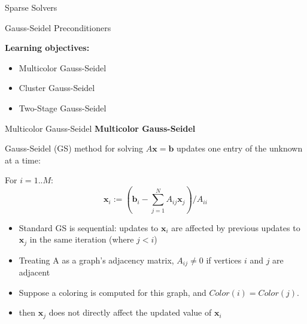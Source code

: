 \begin{frame}[fragile]

  {\Huge Sparse Solvers}

  \vspace{10pt}

  {\large Gauss-Seidel Preconditioners}

  \vspace{20pt}

  \textbf{Learning objectives:}
  \begin{itemize}
    \item {Multicolor Gauss-Seidel}
    \item {Cluster Gauss-Seidel}
    \item {Two-Stage Gauss-Seidel}
  \end{itemize}

  \vspace{-20pt}

\end{frame}


\begin{frame}[fragile]{Multicolor Gauss-Seidel}
\textbf{Multicolor Gauss-Seidel}

Gauss-Seidel (GS) method for solving $A\mathbf{x} = \mathbf{b}$ updates one entry of the unknown at a time:

For $i = 1..M$:
\[ \mathbf{x}_i := (\mathbf{b}_i - \sum_{j=1}^{N} A_{ij}\mathbf{x}_j) / A_{ii}\]

\begin{itemize}
  \item Standard GS is sequential: updates to $\mathbf{x}_i$ are affected by previous updates to $\mathbf{x}_j$ in the same iteration (where $j < i$)
  \item Treating A as a graph's adjacency matrix, $A_{ij} \neq 0$ if vertices $i$ and $j$ are adjacent
  \item Suppose a coloring is computed for this graph, and $\mathit{Color}(i) = \mathit{Color}(j)$.
  \item then $\mathbf{x}_j$ does not directly affect the updated value of $\mathbf{x}_i$
\end{itemize}
\end{frame}

